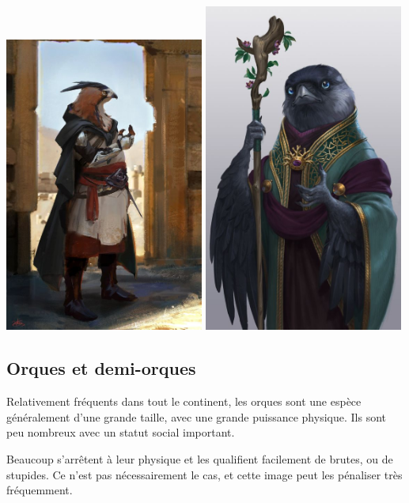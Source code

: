 \documentclass[10pt,a4paper]{book}
\begin{document}
\includegraphics[width=0.49\textwidth]{tengu 1}
\includegraphics[width=0.49\textwidth]{tengu 2}
\subsection{Orques et demi-orques}
Relativement fréquents dans tout le continent, les orques sont une espèce généralement d'une grande taille, avec une grande puissance physique. Ils sont peu nombreux avec un statut social important.

Beaucoup s'arrêtent à leur physique et les qualifient facilement de brutes, ou de stupides. Ce n'est pas nécessairement le cas, et cette image peut les pénaliser très fréquemment.
\end{document}
